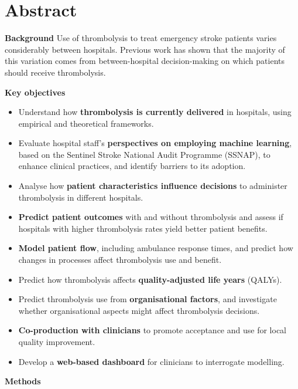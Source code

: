 \section*{Abstract} %

\textbf{Background}
Use of thrombolysis to treat emergency stroke patients varies considerably between hospitals. Previous work has shown that the majority of this variation comes from between-hospital decision-making on which patients should receive thrombolysis.

\textbf{Key objectives}

\begin{itemize}

    \item Understand how \textbf{thrombolysis is currently delivered} in hospitals, using empirical and theoretical frameworks.
    \item Evaluate hospital staff's \textbf{perspectives on employing machine learning}, based on the Sentinel Stroke National Audit Programme (SSNAP), to enhance clinical practices, and identify barriers to its adoption.
    \item Analyse how \textbf{patient characteristics influence decisions} to administer thrombolysis in different hospitals.
    \item \textbf{Predict patient outcomes} with and without thrombolysis and assess if hospitals with higher thrombolysis rates yield better patient benefits.
    \item \textbf{Model patient flow}, including ambulance response times, and predict how changes in processes affect thrombolysis use and benefit.
    \item Predict how thrombolysis affects \textbf{quality-adjusted life years} (QALYs).
    \item Predict thrombolysis use from \textbf{organisational factors}, and investigate whether organisational aspects might affect thrombolysis decisions.
    \item \textbf{Co-production with clinicians} to promote acceptance and use for local quality improvement.
    \item Develop a \textbf{web-based dashboard} for clinicians to interrogate modelling.


\end{itemize}

\textbf{Methods}

